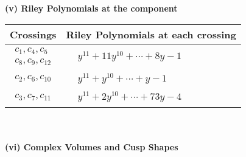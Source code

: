 \documentclass[1p]{elsarticle_modified}
\theoremstyle{definition}
\begin{document}
\newpage\renewcommand{\arraystretch}{1}
\flushleft \textbf{(v) Riley Polynomials at the component}\newline \\
\begin{tabular}{m{50pt}|m{274pt}}
Crossings & \hspace{64pt}Riley Polynomials at each crossing \\
\hline $$\begin{aligned}c_{1},c_{4},c_{5}\\c_{8},c_{9},c_{12}\end{aligned}$$&$\begin{aligned}
&y^{11}+11 y^{10}+\cdots+8 y-1
\end{aligned}$\\
\hline $$\begin{aligned}c_{2},c_{6},c_{10}\end{aligned}$$&$\begin{aligned}
&y^{11}+y^{10}+\cdots+y-1
\end{aligned}$\\
\hline $$\begin{aligned}c_{3},c_{7},c_{11}\end{aligned}$$&$\begin{aligned}
&y^{11}+2 y^{10}+\cdots+73 y-4
\end{aligned}$\\
\hline
\end{tabular}\\~\\
\newpage\flushleft \textbf{(vi) Complex Volumes and Cusp Shapes}
\end{document}
